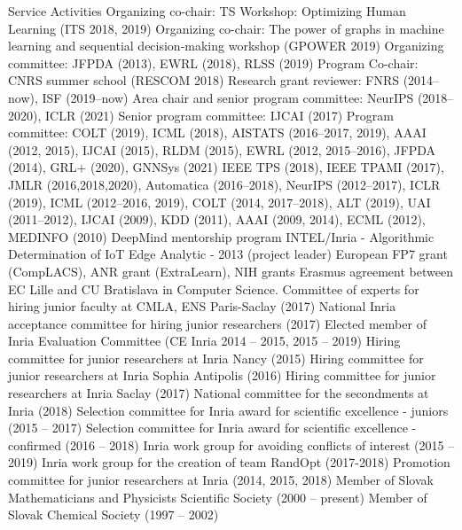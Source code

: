 \documentclass{resume}
\begin{document}

\begin{category}{Service Activities}
\citembullet Organizing co-chair: TS Workshop: Optimizing Human Learning (ITS 2018, 2019)
\citembullet Organizing co-chair: The power of graphs in machine learning and sequential decision-making workshop (GPOWER 2019)
\citembullet Organizing committee: JFPDA (2013), EWRL (2018), RLSS (2019)
\citembullet Program Co-chair: CNRS summer school (RESCOM 2018)
\citembullet Research grant reviewer: FNRS (2014--now), ISF (2019--now)
\citembullet Area chair and senior program committee:  NeurIPS (2018--2020), ICLR  (2021)
\citembullet Senior program committee:  IJCAI (2017)
\citembullet Program committee: COLT (2019), ICML (2018), AISTATS (2016--2017, 2019), AAAI (2012, 2015), IJCAI (2015), RLDM (2015), EWRL 
(2012, 2015--2016), JFPDA (2014), GRL+ (2020), GNNSys (2021)
\citembullet  IEEE TPS (2018), IEEE TPAMI (2017), JMLR (2016,2018,2020), Automatica (2016--2018), NeurIPS (2012--2017), ICLR (2019), ICML (2012--2016, 2019), COLT
(2014, 2017--2018), ALT (2019), UAI (2011--2012), IJCAI (2009), KDD (2011), AAAI (2009, 2014), ECML
(2012), MEDINFO (2010)
\citembullet DeepMind mentorship program
\citembullet INTEL/Inria - Algorithmic Determination of IoT Edge Analytic -
2013 (project leader)
\citembullet  European FP7 grant (CompLACS), ANR grant (ExtraLearn), NIH grants
\citembullet Erasmus agreement between EC Lille and CU Bratislava in Computer
Science.
\citembullet Committee of experts for hiring junior faculty at CMLA, ENS Paris-Saclay  (2017)
\citembullet National Inria acceptance committee for hiring junior researchers (2017)
\citembullet Elected member of Inria Evaluation Committee (CE Inria 2014 -- 2015, 2015 -- 2019)
\citembullet Hiring committee for junior researchers at Inria Nancy (2015)
\citembullet Hiring committee for junior researchers at Inria Sophia Antipolis (2016)
\citembullet Hiring committee for junior researchers at Inria Saclay (2017)
\citembullet National committee for the secondments at Inria (2018)
\citembullet Selection committee for Inria award for scientific excellence - juniors (2015 -- 2017)
\citembullet Selection committee for Inria award for scientific excellence - confirmed (2016 -- 2018)
\citembullet Inria work group for avoiding conflicts of interest (2015 -- 2019)
\citembullet Inria work group for the creation of team RandOpt (2017-2018)
\citembullet Promotion committee for junior researchers at Inria (2014, 2015, 2018)
\citembullet Member of Slovak Mathematicians and Physicists Scientific Society 
(2000 -- present)
\citembullet Member of Slovak Chemical Society (1997 -- 2002)
\end{category}
\end{document}
